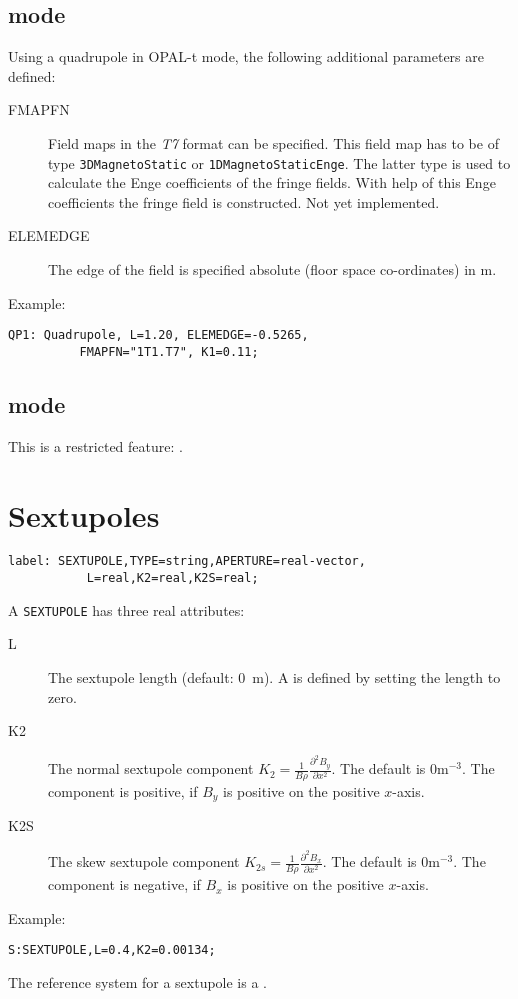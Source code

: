 \subsection{\opalt mode}
\label{sec:quadrupole-t}
Using a quadrupole in OPAL-t mode, the following additional parameters are defined:
\begin{description}
\item[FMAPFN]
  Field maps in the {\em T7} format can be specified. This field map has to be of type \texttt{3DMagnetoStatic} or \texttt{1DMagnetoStaticEnge}. The latter type is used to calculate the Enge coefficients of the fringe fields. With help of this Enge coefficients the fringe field is constructed. Not yet implemented.
\item[ELEMEDGE]
  The edge of the field is specified absolute (floor space co-ordinates) in m.
  \end{description}
\noindent Example:
\begin{verbatim}
QP1: Quadrupole, L=1.20, ELEMEDGE=-0.5265, 
          FMAPFN="1T1.T7", K1=0.11;
\end{verbatim}

\subsection{\opalcycl mode}

This is a restricted feature:  \noopalcycl .

\section{Sextupoles}
\label{sec:sextupole}
\begin{verbatim}
label: SEXTUPOLE,TYPE=string,APERTURE=real-vector,
           L=real,K2=real,K2S=real;
\end{verbatim}
A \texttt{SEXTUPOLE} has three real attributes:
\begin{description}
\item[L]
  The sextupole length (default: 0~m).
  A  is defined by setting the length to zero.
\item[K2]
  The normal sextupole component
  $K_2=\frac{1}{B \rho}\frac{\partial^2 B_y}{\partial x^2}$.
  The default is $0 \mathrm{m}^{-3}$.
  The component is positive, if $B_y$ is positive on the positive $x$-axis.
\item[K2S]
  The skew sextupole component
  $K_{2s}=\frac{1}{B \rho}\frac{\partial^2 B_x}{\partial x^2}$.
  The default is $0 \mathrm{m}^{-3}$.
  The component is negative, if $B_x$ is positive on the positive $x$-axis.
\end{description}
\noindent Example:
\begin{verbatim}
S:SEXTUPOLE,L=0.4,K2=0.00134;
\end{verbatim}
The reference system for a sextupole is a 
.
